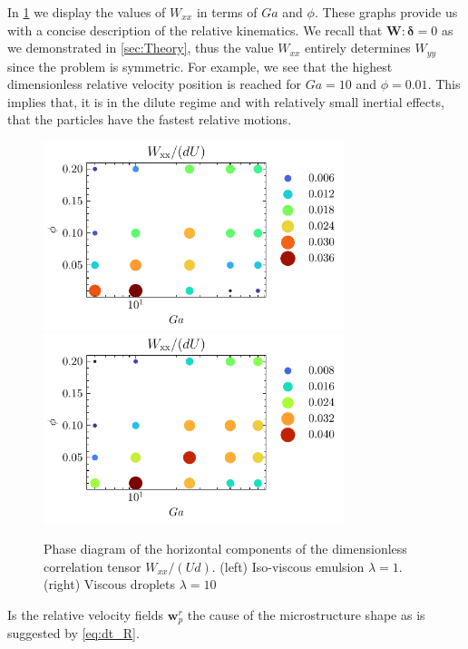 In \ref{fig:phase} we display the values of $W_{xx}$ in terms of $Ga$ and $\phi$. 
These graphs provide us with a concise description of the relative kinematics. 
We recall that $\textbf{W}:\bm\delta = 0$ as we demonstrated in \ref{sec:Theory}, thus the value  $W_{xx}$ entirely determines $W_{yy}$ since the problem is symmetric. 
For example, we see that the highest dimensionless relative velocity position is reached for $Ga = 10$ and $\phi = 0.01$. 
This implies that, it is in the dilute regime and with relatively small inertial effects, that the particles have the fastest relative motions. 
\begin{figure}[h!]
    \centering
    \includegraphics[height=5.5cm]{image/HOMOGENEOUS_NEW/PA/phase_Wxx_l_1.pdf}
    \includegraphics[height=5.5cm]{image/HOMOGENEOUS_NEW/PA/phase_Wxx_l_10.pdf}
    \caption{Phase diagram of the horizontal components of the dimensionless correlation tensor $W_{xx}/(Ud)$. 
        (left) Iso-viscous emulsion $\lambda = 1$.
        (right) Viscous droplets $\lambda = 10$ }
    \label{fig:phase}
\end{figure}
Is the relative velocity fields $\textbf{w}_p^r$ the cause of the microstructure shape as is suggested by \ref{eq:dt_R}. 
